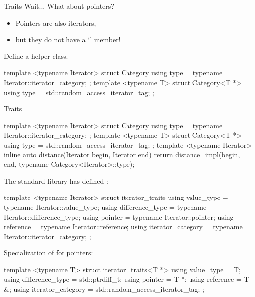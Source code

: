 \begin{frame}[fragile]{Traits}
    Wait... What about pointers?
    \begin{itemize}
        \item Pointers are also iterators,
        \item but they do not have a `' member!
    \end{itemize}
    \pause
    Define a helper class.
    \begin{cpp}
template <typename Iterator>
struct Category {
  using type = typename Iterator::iterator_category;
};
template <typename T>
struct Category<T *> {
  using type = std::random_access_iterator_tag;
};
    \end{cpp}
\end{frame}

\begin{frame}[fragile]{Traits}
    \begin{cpp}
template <typename Iterator>
struct Category {
  using type = typename Iterator::iterator_category;
};
template <typename T>
struct Category<T *> {
  using type = std::random_access_iterator_tag;
};
template <typename Iterator>
inline auto distance(Iterator begin, Iterator end) {
  return distance_impl(begin, end,
                    typename Category<Iterator>::type{});
}
    \end{cpp}
\end{frame}

\begin{frame}[fragile]{}
    The standard library has defined :
    \begin{cpp}
template <typename Iterator>
struct iterator_traits {
  using value_type = typename Iterator::value_type;
  using difference_type
      = typename Iterator::difference_type;
  using pointer = typename Iterator::pointer;
  using reference = typename Iterator::reference;
  using iterator_category
      = typename Iterator::iterator_category;
};
    \end{cpp}
\end{frame}

\begin{frame}[fragile]{}
    Specialization of  for pointers:
    \begin{cpp}
template <typename T>
struct iterator_traits<T *> {
  using value_type = T;
  using difference_type = std::ptrdiff_t;
  using pointer = T *;
  using reference = T &;
  using iterator_category
      = std::random_access_iterator_tag;
};
    \end{cpp}
\end{frame}

